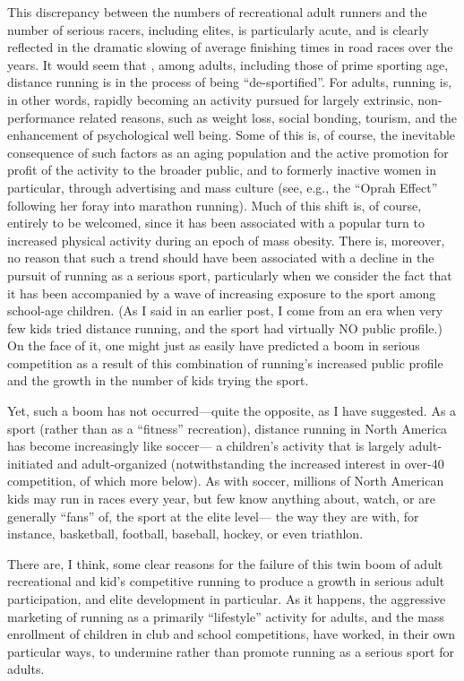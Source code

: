 This discrepancy between the numbers of recreational adult runners and the number of serious racers, including elites, is particularly acute, and is clearly reflected in the dramatic slowing of average finishing times in road races over the years. It would seem that , among adults, including those of prime sporting age, distance running is in the process of being “de-sportified”. For adults, running is, in other words, rapidly becoming an activity pursued for largely extrinsic, non-performance related reasons, such as weight loss, social bonding, tourism, and the enhancement of psychological well being. Some of this is, of course, the inevitable consequence of such factors as an aging population and the active promotion for profit of the activity to the broader public, and to formerly inactive women in particular, through advertising and mass culture (see, e.g., the “Oprah Effect” following her foray into marathon running). Much of this shift is, of course, entirely to be welcomed, since it has been associated with a popular turn to increased physical activity during an epoch of mass obesity. There is, moreover, no reason that such a trend should have been associated with a decline in the pursuit of running as a serious sport, particularly when we consider the fact that it has been accompanied by a wave of increasing exposure to the sport among school-age children. (As I said in an earlier post, I come from an era when very few kids tried distance running, and the sport had virtually NO public profile.) On the face of it, one might just as easily have predicted a boom in serious competition as a result of this combination of running’s increased public profile and the growth in the number of kids trying the sport.

Yet, such a boom has not occurred—quite the opposite, as I have suggested. As a sport (rather than as a “fitness” recreation), distance running in North America has become increasingly like soccer— a children’s activity that is largely adult-initiated and adult-organized (notwithstanding the increased interest in over-40 competition, of which more below). As with soccer, millions of North American kids may run in races every year, but few know anything about, watch, or are generally “fans” of, the sport at the elite level— the way they are with, for instance, basketball, football, baseball, hockey, or even triathlon.

There are, I think, some clear reasons for the failure of this twin boom of adult recreational and kid’s competitive running to produce a growth in serious adult participation, and elite development in particular. As it happens, the aggressive marketing of running as a primarily “lifestyle” activity for adults, and the mass enrollment of children in club and school competitions, have worked, in their own particular ways, to undermine rather than promote running as a serious sport for adults.

